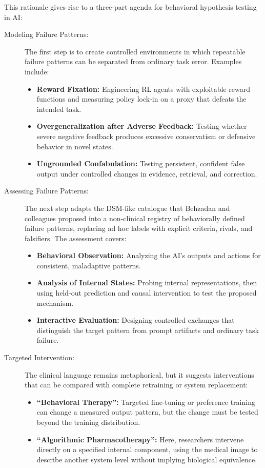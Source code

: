 \documentclass{article}
\begin{document}
This rationale gives rise to a three-part agenda for behavioral hypothesis testing in AI:
\begin{description}
    \item[Modeling Failure Patterns:] The first step is to create controlled environments in which repeatable failure patterns can be separated from ordinary task error. Examples include:
    \begin{itemize}
        \item \textbf{Reward Fixation:} Engineering RL agents with exploitable reward functions and measuring policy lock-in on a proxy that defeats the intended task.
        \item \textbf{Overgeneralization after Adverse Feedback:} Testing whether severe negative feedback produces excessive conservatism or defensive behavior in novel states.
        \item \textbf{Ungrounded Confabulation:} Testing persistent, confident false output under controlled changes in evidence, retrieval, and correction.
    \end{itemize}
    \item[Assessing Failure Patterns:] The next step adapts the DSM-like catalogue that Behzadan and colleagues proposed \citep{ref3} into a non-clinical registry of behaviorally defined failure patterns, replacing ad hoc labels with explicit criteria, rivals, and falsifiers. The assessment covers:
    \begin{itemize}
        \item \textbf{Behavioral Observation:} Analyzing the AI's outputs and actions for consistent, maladaptive patterns.
        \item \textbf{Analysis of Internal States:} Probing internal representations, then using held-out prediction and causal intervention to test the proposed mechanism.
        \item \textbf{Interactive Evaluation:} Designing controlled exchanges that distinguish the target pattern from prompt artifacts and ordinary task failure.
    \end{itemize}
    \item[Targeted Intervention:] The clinical language remains metaphorical, but it suggests interventions that can be compared with complete retraining or system replacement:
    \begin{itemize}
        \item \textbf{``Behavioral Therapy'':} Targeted fine-tuning or preference training can change a measured output pattern, but the change must be tested beyond the training distribution.
        \item \textbf{``Algorithmic Pharmacotherapy'':} Here, researchers intervene directly on a specified internal component, using the medical image to describe another system level without implying biological equivalence.
    \end{itemize}
\end{description}
\end{document}
